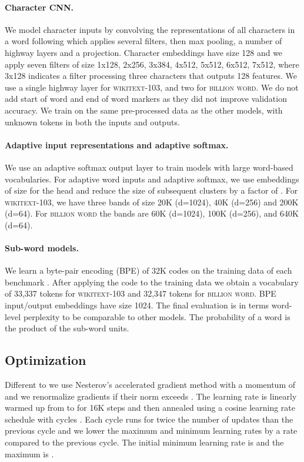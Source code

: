 \documentclass{article} \usepackage{iclr2019_conference,times}
\def\gbw{\textsc{billion word}}
\def\wiki{\textsc{wikitext-103}}
\begin{document}
\paragraph{Character CNN.}
We model character inputs by convolving the representations of all characters in a word following \citet{charcnn} which applies several filters, then max pooling, a number of highway layers and a projection.
Character embeddings have size 128 and we apply seven filters of size 1x128, 2x256, 3x384, 4x512, 5x512, 6x512, 7x512, where 3x128 indicates a filter processing three characters that outputs 128 features. 
We use a single highway layer for \wiki{}, and two for \gbw{}.
We do not add start of word and end of word markers as they did not improve validation accuracy. 
We train on the same pre-processed data as the other models, with unknown tokens in both the inputs and outputs. 
\paragraph{Adaptive input representations and adaptive softmax.}
We use an adaptive softmax output layer to train models with large word-based vocabularies.
For adaptive word inputs and adaptive softmax, we use embeddings of size  for the head and reduce the size of subsequent clusters by a factor of . 
For \wiki{}, we have three bands of size 20K (d=1024), 40K (d=256) and 200K (d=64).
For \gbw{} the bands are 60K (d=1024), 100K (d=256), and 640K (d=64). 

\paragraph{Sub-word models.}
We learn a byte-pair encoding (BPE) of 32K codes on the training data of each benchmark \citep{bpe}. 
After applying the code to the training data we obtain a vocabulary of 33,337 tokens for \wiki{} and 32,347 tokens for \gbw{}.
BPE input/output embeddings have size 1024.
The final evaluation is in terms word-level perplexity to be comparable to other models. The probability of a word is the product of the sub-word units. 

\subsection{Optimization}

Different to \citet{vaswani2017transformer} we use Nesterov's accelerated gradient method \citep{sutskever2013icml} with a momentum of  and we renormalize gradients if their norm exceeds  \citep{pascanu2013difficulty}.
The learning rate is linearly warmed up from  to  for 16K steps and then annealed using a cosine learning rate schedule with  cycles \citep{cosine}.
Each cycle runs for twice the number of updates than the previous cycle and we lower the maximum and minimum learning rates by a rate  compared to the previous cycle. 
The initial minimum learning rate is  and the maximum is . 
\end{document}
